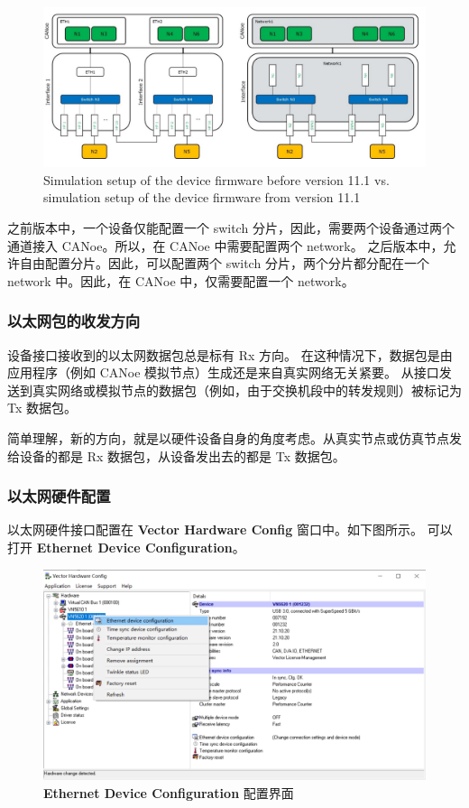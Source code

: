 \begin{figure}[ht]
    \centering
    \includegraphics[scale=0.6]{pic/Snipaste_2021-10-29_14-42-44.png}
    \caption{ Simulation setup of the device firmware before version 11.1 vs. simulation setup of the device firmware from version 11.1}
    \label{fig:two_setup}
\end{figure}

之前版本中，一个设备仅能配置一个 switch 分片，因此，需要两个设备通过两个通道接入 CANoe。所以，在 CANoe 中需要配置两个 network。
之后版本中，允许自由配置分片。因此，可以配置两个 switch 分片，两个分片都分配在一个 network 中。因此，在 CANoe 中，仅需要配置一个 network。

\subsubsection{以太网包的收发方向}
设备接口接收到的以太网数据包总是标有 Rx 方向。 在这种情况下，数据包是由应用程序（例如 CANoe 模拟节点）生成还是来自真实网络无关紧要。
从接口发送到真实网络或模拟节点的数据包（例如，由于交换机段中的转发规则）被标记为 Tx 数据包。 
\begin{note}
    简单理解，新的方向，就是以硬件设备自身的角度考虑。从真实节点或仿真节点发给设备的都是 Rx 数据包，从设备发出去的都是 Tx 数据包。
\end{note}

\subsubsection{以太网硬件配置}
以太网硬件接口配置在 \textbf{Vector Hardware Config} 窗口中。如下图所示。
可以打开 \textbf{Ethernet Device Configuration}。

\begin{figure}[ht]
    \centering
    \includegraphics[scale=0.6]{pic/Snipaste_2021-10-29_15-00-01.png}
    \caption{ \textbf{Ethernet Device Configuration} 配置界面}
    \label{fig:Ethernet_Device_Configuration}
\end{figure}

